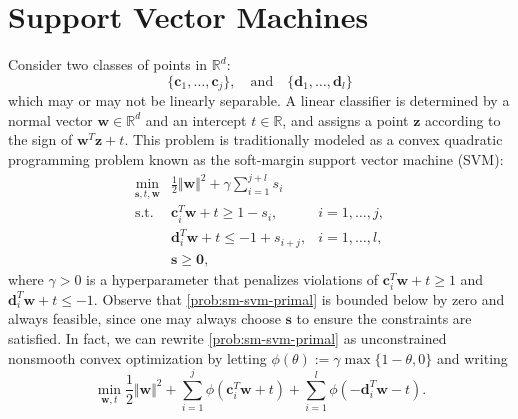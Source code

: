 \documentclass[twoside,11pt]{article}
\newcommand\bz{\bm{0}}
\renewcommand{\c}{\bm{c}}
\renewcommand{\d}{\bm{d}}
\newcommand{\R}{{\mathbb{R}}} %
\newcommand\s{\bm{s}}
\newcommand\w{\bm{w}}
\newcommand\z{\bm{z}}
\begin{document}
\section{Support Vector Machines} \label{sec:svm}
Consider two classes of points in $\R^d$:
\[
    \{\c_1,\hdots,\c_j\},\quad\text{and}\quad\{\d_1,\hdots,\d_l\}
\]
which may or may not be linearly separable. A linear classifier is determined by a normal vector $\w \in \R^d$ and an intercept $t \in \R$, and assigns a point $\z$ according to the sign of $\w^T\z + t$.
This problem is traditionally modeled as a convex quadratic programming problem known as the soft-margin support vector machine (SVM):
\begin{equation} \label{prob:sm-svm-primal}
  \begin{array}{rll}
  \min_{\s,t,\w}& \frac{1}{2}\Vert\w\Vert^2+\gamma\sum_{i=1}^{j+l}s_i \\
  \mbox{s.t.} & \c_i^T\w+t\ge 1-s_i, &
  i=1,\ldots, j, \\
  &\d_i^T\w+t\le -1 + s_{i+j}, &
  i=1,\ldots,l, \\
  &\s\ge\bz,
  \end{array}
\end{equation}
where $\gamma > 0$ is a hyperparameter that penalizes violations of  $\c_i^T\w + t \geq 1$ and $\d_i^T\w + t \leq -1$.
Observe that \eqref{prob:sm-svm-primal} is bounded below by zero and always feasible, since one may always choose $\s$ to ensure the constraints
are satisfied. In fact, we can rewrite \eqref{prob:sm-svm-primal} as unconstrained nonsmooth convex optimization by letting
$\phi(\theta) := \gamma\max\{1-\theta,0\}$ and writing
\begin{equation} \label{prob:svm-unconstrained-primal}
  \min_{\w,t} \frac{1}{2}\Vert\w\Vert^2+\sum_{i=1}^{j}\phi(\c_i^T\w+t)+\sum_{i=1}^l\phi(-\d_i^T\w-t).
\end{equation}
\end{document}
